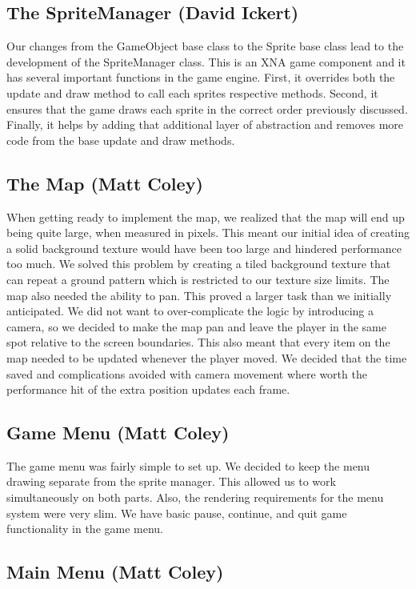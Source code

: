 \documentclass[]{article}
\begin{document}
		\subsection{The SpriteManager (David Ickert)}
			Our changes from the GameObject base class to the Sprite base class lead to the development of the SpriteManager class.  This is an XNA game component and it has several important functions in the game engine.  First, it overrides both the update and draw method to call each sprites respective methods.  Second, it ensures that the game draws each sprite in the correct order previously discussed.  Finally, it helps by adding that additional layer of abstraction and removes more code from the base update and draw methods.
		\subsection{The Map (Matt Coley)}
			When getting ready to implement the map, we realized that the map will end up being quite large, when measured in pixels.  This meant our initial idea of creating a solid background texture would have been too large and hindered performance too much.  We solved this problem by creating a tiled background texture that can repeat a ground pattern which is restricted to our texture size limits.  The map also needed the ability to pan.  This proved a larger task than we initially anticipated.  We did not want to over-complicate the logic by introducing a camera, so we decided to make the map pan and leave the player in the same spot relative to the screen boundaries.  This also meant that every item on the map needed to be updated whenever the player moved.  We decided that the time saved and complications avoided with camera movement where worth the performance hit of the extra position updates each frame.
		\subsection{Game Menu (Matt Coley)}
			The game menu was fairly simple to set up.  We decided to keep the menu drawing separate from the sprite manager.  This allowed us to work simultaneously on both parts.  Also, the rendering requirements for the menu system were very slim.  We have basic pause, continue, and quit game functionality in the game menu.
		\subsection{Main Menu (Matt Coley)}
			
			
\end{document}
